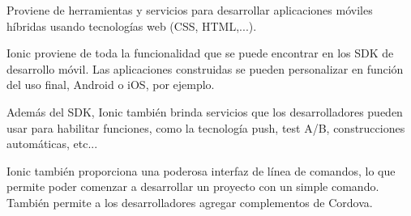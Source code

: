Proviene de herramientas y servicios para desarrollar aplicaciones móviles híbridas usando tecnologías web (CSS, HTML,...).

Ionic proviene de toda la funcionalidad que se puede encontrar en los SDK de desarrollo móvil. Las aplicaciones construidas se pueden personalizar en función del uso final, Android o iOS, por ejemplo.

Además del SDK, Ionic también brinda servicios que los desarrolladores pueden usar para habilitar funciones, como la tecnología push, test A/B, construcciones automáticas, etc...

Ionic también proporciona una poderosa interfaz de línea de comandos, lo que permite poder comenzar a desarrollar un proyecto con un simple comando. También permite a los desarrolladores agregar complementos de Cordova.


